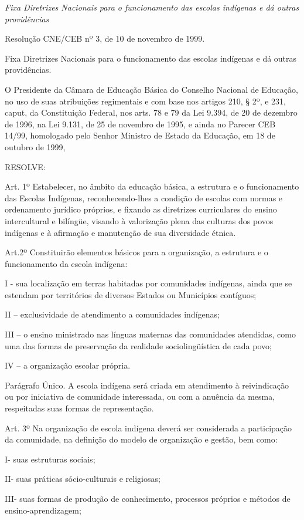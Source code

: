 \documentclass[
]{book}
\begin{document}
\emph{Fixa Diretrizes Nacionais para o funcionamento das escolas indígenas e dá outras providências}

Resolução CNE/CEB nº 3, de 10 de novembro de 1999.

Fixa Diretrizes Nacionais para o funcionamento das escolas indígenas e dá outras providências.

O Presidente da Câmara de Educação Básica do Conselho Nacional de Educação, no uso de suas atribuições regimentais e com base nos artigos 210, § 2º, e 231, caput, da Constituição Federal, nos arts. 78 e 79 da Lei 9.394, de 20 de dezembro de 1996, na Lei 9.131, de 25 de novembro de 1995, e ainda no Parecer CEB 14/99, homologado pelo Senhor Ministro de Estado da Educação, em 18 de outubro de 1999,

RESOLVE:

Art. 1º Estabelecer, no âmbito da educação básica, a estrutura e o funcionamento das Escolas Indígenas, reconhecendo-lhes a condição de escolas com normas e ordenamento jurídico próprios, e fixando as diretrizes curriculares do ensino intercultural e bilíngüe, visando à valorização plena das culturas dos povos indígenas e à afirmação e manutenção de sua diversidade étnica.

Art.2º Constituirão elementos básicos para a organização, a estrutura e o funcionamento da escola indígena:

I - sua localização em terras habitadas por comunidades indígenas, ainda que se estendam por territórios de diversos Estados ou Municípios contíguos;

II -- exclusividade de atendimento a comunidades indígenas;

III -- o ensino ministrado nas línguas maternas das comunidades atendidas, como uma das formas de preservação da realidade sociolingüística de cada povo;

IV -- a organização escolar própria.

Parágrafo Único. A escola indígena será criada em atendimento à reivindicação ou por iniciativa de comunidade interessada, ou com a anuência da mesma, respeitadas suas formas de representação.

Art. 3º Na organização de escola indígena deverá ser considerada a participação da comunidade, na definição do modelo de organização e gestão, bem como:

I- suas estruturas sociais;

II- suas práticas sócio-culturais e religiosas;

III- suas formas de produção de conhecimento, processos próprios e métodos de ensino-aprendizagem;
\end{document}
